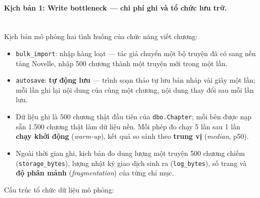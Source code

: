 \paragraph{Kịch bản 1: Write bottleneck --- chi phí ghi và tổ chức lưu trữ.}\mbox{}\\
Kịch bản mô phỏng hai tình huống của chức năng viết chương:
\begin{itemize}
    \item \texttt{bulk\_import}: nhập hàng loạt --- tác giả chuyển một bộ truyện đã có sang nền tảng Novelle, nhập 500 chương thành một truyện mới trong một lần.
    \item \texttt{autosave}: \textbf{tự động lưu} --- trình soạn thảo tự lưu bản nháp vài giây một lần; mỗi lần ghi lại nội dung của cùng một chương, nội dung thay đổi sau mỗi lần lưu.
    \item Dữ liệu ghi là 500 chương thật đầu tiên của \texttt{dbo.Chapter}; mỗi bên được nạp sẵn 1.500 chương thật làm dữ liệu nền. Mỗi phép đo chạy 5 lần sau 1 lần \textbf{chạy khởi động} (\textit{warm-up}), kết quả so sánh theo \textbf{trung vị} (\textit{median}, p50).
    \item Ngoài thời gian ghi, kịch bản đo dung lượng một truyện 500 chương chiếm (\texttt{storage\_bytes}), lượng nhật ký giao dịch sinh ra (\texttt{log\_bytes}), số trang và \textbf{độ phân mảnh} (\textit{fragmentation}) của từng chỉ mục.
\end{itemize}
Cấu trúc tổ chức dữ liệu mô phỏng:
